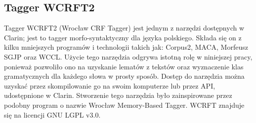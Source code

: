 \subsection{Tagger WCRFT2}
Tagger WCRFT2 (Wrocław CRF Tagger) jest jednym z narzędzi dostępnych w Clarin; jest to tagger morfo-syntaktyczny dla języka polskiego. Składa się on z kilku mniejszych programów i technologii takich jak: Corpus2, MACA, Morfeusz SGJP \cite{wcrft} oraz WCCL. Użycie tego narzędzia odgrywa istotną rolę w niniejszej pracy, ponieważ pozwoliło ono na uzyskanie lematów z tekstów oraz wyznaczenie klas gramatycznych dla każdego słowa w prosty sposób. Dostęp do narzędzia można uzyskać przez skompilowanie go na swoim komputerze lub przez API, udostępnione w Clarin. Stworzenie tego narzędzia było zainspirowane przez podobny program o nazwie Wrocław Memory-Based Tagger. WCRFT znajduje się na licencji GNU LGPL v3.0.

